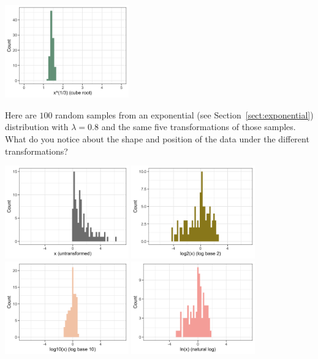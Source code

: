 \begin{question}{}
\begin{center}
\includegraphics[width=0.4\textwidth]{img/normal-transform-5.png}
\end{center}
\end{question}

\begin{question}{}
Here are $100$ random samples from an exponential (see Section~\ref{sect:exponential}) distribution with $\lambda = 0.8$ and the same five transformations of those samples. What do you notice about the shape and position of the data under the different transformations?
\begin{center}
\includegraphics[width=0.4\textwidth]{img/exp-transform-0.png}
\includegraphics[width=0.4\textwidth]{img/exp-transform-1.png}
\includegraphics[width=0.4\textwidth]{img/exp-transform-2.png}
\includegraphics[width=0.4\textwidth]{img/exp-transform-3.png}

\end{center}
\end{question}
